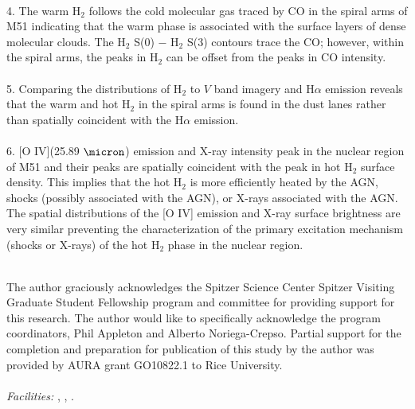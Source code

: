 \documentclass[12pt,preprint]{aastex}
\begin{document}
\\
4. The warm H$_2$ follows the cold molecular gas traced by CO 
in the spiral arms of M51 indicating that the warm phase is associated 
with the surface layers of dense molecular clouds.  The H$_2$ S(0) $-$
H$_2$ S(3) contours trace the CO; however, within the spiral
arms, the peaks in H$_2$ can be offset from the peaks in CO
intensity.\\
\\
5.  Comparing the distributions of H$_2$ to 
$V$ band imagery and H$\alpha$ emission reveals
that the warm and hot H$_2$ in the spiral arms is found in the dust lanes
rather than spatially coincident with the H$\alpha$ emission.\\
\\
6.  [O IV](25.89 $\micron$) emission and X-ray
intensity peak in the nuclear region of M51 and their 
peaks are spatially coincident with the peak in hot H$_2$ 
surface density.  This implies that the hot H$_2$ 
is more efficiently heated by the AGN, shocks (possibly associated
with the AGN), or X-rays associated with the AGN.  The spatial
distributions of the [O IV] emission and X-ray surface brightness are
very similar preventing the characterization of the primary excitation 
mechanism (shocks or X-rays) of the hot H$_2$ phase in the nuclear region.\\ 
\\

\acknowledgments

The author graciously acknowledges the Spitzer Science Center Spitzer
Visiting Graduate Student Fellowship program and committee for
providing support for this research.  The author would like to
specifically acknowledge the program coordinators, Phil Appleton and
Alberto Noriega-Crepso. 
Partial support for the completion and preparation for publication of this study by the
author was provided by AURA grant GO10822.1 to Rice
University.\\ 
\\
{\it Facilities:} , ,
.
\end{document}
